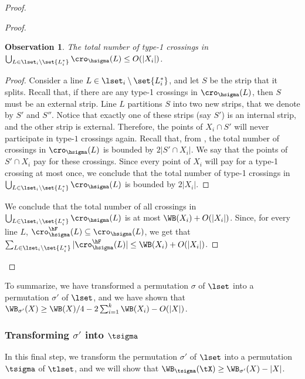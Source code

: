\documentclass{toc}
\newtheorem{myobs}[theorem]{Observation}
\begin{document}
\begin{proof}
\begin{proof}
		
		\begin{myobs}\label{obs: type 1 crossings}
			The total number of type-1 crossings in $\bigcup_{L\in \lset_i\setminus\set{L_i^*}}\cro_{\hsigma}(L)\leq O(|X_i|)$.
		\end{myobs}
		\begin{proof}
			Consider a line $L\in \lset_i\setminus\set{L_i^*}$, and let $S$ be the strip that it splits. Recall that, if there are any type-1 crossings in $\cro_{\hsigma}(L)$, then $S$ must be an external strip. Line $L$ partitions $S$ into two new strips, that we denote by $S'$ and $S''$. Notice that exactly one of these strips (say $S'$) is an internal strip, and the other strip is external. Therefore, the points of $X_i\cap S'$ will never participate in type-$1$ crossings again. Recall that, from , the total number of crossings in $\cro_{\hsigma}(L)$ is bounded by $2|S'\cap X_i|$. We say that the points of $S'\cap X_i$ pay for these crossings. Since every point of $X_i$ will pay for a type-1 crossing at most once, we conclude that the total number of type-1 crossings in $\bigcup_{L\in \lset_i\setminus\set{L_i^*}}\cro_{\hsigma}(L)$ is bounded by $2|X_i|$.
		\end{proof}
		
		We conclude that the total number of all crossings in $\bigcup_{L\in \lset_i\setminus\set{L_i^*}}\cro_{\hsigma}(L)$ is at most $\WB(X_i)+O(|X_i|)$. Since, for every line $L$, $\cro_{\hsigma}^{\hF}(L)\subseteq \cro_{\hsigma}(L)$, we get that $\sum_{L\in \lset_i\setminus\set{L_i^*}}|\cro^{\hF}_{\hsigma}(L)|\leq \WB(X_i)+O(|X_i|)$.
	\end{proof}			
\end{proof}


To summarize, we have transformed a permutation $\sigma$ of $\lset$ into a permutation $\sigma'$ of $\lset$, and we have shown that  $\WB_{\sigma'}(X)\geq \WB(X)/4-2\sum_{i=1}^k\WB(X_i)-O(|X|)$.


\subsubsection{Transforming $\sigma'$ into $\tsigma$}


In this final step, we transform the permutation $\sigma'$ of $\lset$ into a permutation $\tsigma$ of $\tlset$, and we will show that $\WB_{\tsigma}(\tX)\geq \WB_{\sigma'}(X)-|X|$.
\end{document}
